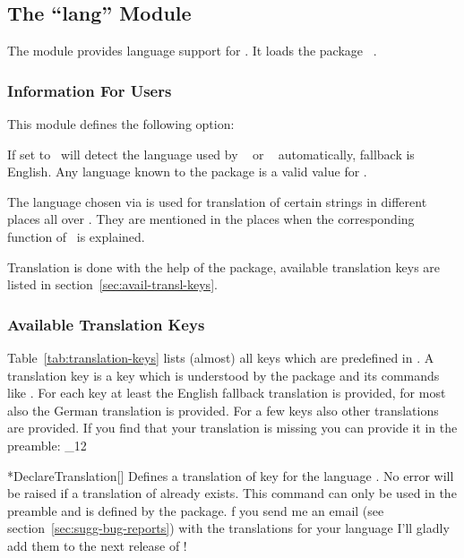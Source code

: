 \documentclass[load-preamble+]{cnltx-doc}
\makeatletter
\def\chemmodule*#1{\textquotedblleft#1\textquotedblright}%
\renewenvironment{commands}
  {%
    \cnltx@set@catcode_{12}%
    \let\command\cnltx@command
    \cnltxlist
  }
  {\endcnltxlist}
\makeatother
\begin{document}
\subsection{The \chemmodule*{lang} Module}\label{sec:lang-module}

The  module provides language support for \chemmacros.  It
loads the package ~\cite{pkg:translations}.

\subsubsection{Information For Users}

This module defines the following option:
\begin{options}
    If set to  \chemmacros\ will detect the language used by
    ~\cite{pkg:babel} or ~\cite{pkg:polyglossia}
    automatically, fallback is English.  Any language known to the
     package is a valid value for .
\end{options}

The language chosen via  is used for translation of certain
strings in different places all over \chemmacros.  They are mentioned in the
places when the corresponding function of \chemmacros\ is explained.

Translation is done with the help of the  package, available
translation keys are listed in section~\vref{sec:avail-transl-keys}.

\subsubsection{Available Translation Keys}\label{sec:avail-transl-keys}

Table~\vref{tab:translation-keys} lists (almost) all keys which are predefined
in \chemmacros.  A translation key is a key which is understood by the
 package and its commands like .  For
each key at least the English fallback translation is provided, for most also
the German translation is provided.  For a few keys also other translations
are provided.  If you find that your translation is missing you can provide it
in the preamble:
\begin{commands}
  \command*{DeclareTranslation}[]
    Defines a translation of key  for the language .
    No error will be raised if a translation of  already exists.
    This command can only be used in the preamble and is defined by the
     package.
\end{commands}
f you send me an email (see section~\vref{sec:sugg-bug-reports}) with the
translations for your language I'll gladly add them to the next release of
\chemmacros!
\end{document}

